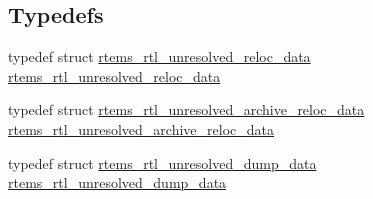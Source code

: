 \subsection*{Typedefs}
\begin{DoxyCompactItemize}
\item 
typedef struct \mbox{\hyperlink{structrtems__rtl__unresolved__reloc__data}{rtems\+\_\+rtl\+\_\+unresolved\+\_\+reloc\+\_\+data}} \mbox{\hyperlink{rtl-unresolved_8c_a8009420221ec8092212e0c5d54a658e6}{rtems\+\_\+rtl\+\_\+unresolved\+\_\+reloc\+\_\+data}}
\item 
typedef struct \mbox{\hyperlink{structrtems__rtl__unresolved__archive__reloc__data}{rtems\+\_\+rtl\+\_\+unresolved\+\_\+archive\+\_\+reloc\+\_\+data}} \mbox{\hyperlink{rtl-unresolved_8c_aa5ce530d170a1f8b7a092a71413800a6}{rtems\+\_\+rtl\+\_\+unresolved\+\_\+archive\+\_\+reloc\+\_\+data}}
\item 
typedef struct \mbox{\hyperlink{structrtems__rtl__unresolved__dump__data}{rtems\+\_\+rtl\+\_\+unresolved\+\_\+dump\+\_\+data}} \mbox{\hyperlink{rtl-unresolved_8c_a42b8775df426c03e56deaea007d584af}{rtems\+\_\+rtl\+\_\+unresolved\+\_\+dump\+\_\+data}}
\end{DoxyCompactItemize}

